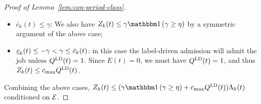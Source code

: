 \begin{proof}[Proof of Lemma~\ref{lem:con-period-class}]
\begin{itemize}
\begin{itemize}
    We consider the symmetric points of $\btheta^+$ and $\btheta^-$ in the confidence sets:  $\btheta^{',+} \coloneqq 2\hat{\btheta}^+(t-1) - \btheta^+$ and $\btheta^{',-} \coloneqq 2\hat{\btheta}^-(t-1) - \btheta^-$. The corresponding difference, e.g., the symmetric point for $\bolds{c}$, is $\bolds{c}^{'} \coloneqq \btheta^{',+} - \btheta^{',-}.$  We know $\btheta^{',+} \in \set{C}^+_{t-1}$ since $\btheta^{',+} - \hat{\btheta}^+(t-1) = -(\btheta^{+} - \hat{\btheta}(t-1))$. Similarly  $\btheta^{',-} \in \set{C}^-_{t-1}$ and thus $\bolds{c}^{'} \in \set{C}_{t-1}.$ However, recall that we are in the scenario where $\bphi_k^{\trans}\hat{\bolds{c}}(t-1)\leq 0$ and thus $\bphi_k^{\trans}\bolds{c}^{'} = \bphi_k^{\trans}(2\hat{\bolds{c}}(t-1) - \bolds{c}) < 0 - \gamma = -\gamma$. This contradicts the assumption that $\ubar{c}_k(t) = \min_{\bolds{c} \in \set{C}_{t-1}} \bphi_k^{\trans}\bolds{c} \geq -\gamma$. Therefore, $\bar{c}_k(t) > \gamma$ is impossible.
\end{itemize}
\item $\bar{c}_k(t) \leq \gamma$: We also have $Z_k(t) \leq \gamma \indic{\gamma \geq \eta}$ by a symmetric argument of the above case;
\item $\underline{c}_k(t) \leq -\gamma < \gamma \leq \bar{c}_k(t)$: in this case the label-driven admission will admit the job unless $Q^{\mathcal{\textsc{LD}}}(t) = 1$. Since $E(t) = 0$, we must have $Q^{\mathcal{\textsc{LD}}}(t) = 1$, and thus $Z_k(t) \leq c_{\max} Q^{\mathcal{\textsc{LD}}}(t)$.
\end{itemize}
Combining the above cases, $Z_k(t) \leq (\gamma\indic{\gamma \geq \eta} +c_{\max}Q^{\ld}(t))\Lambda_k(t)$ conditioned on $\mathcal{E}$. 
\end{proof}

